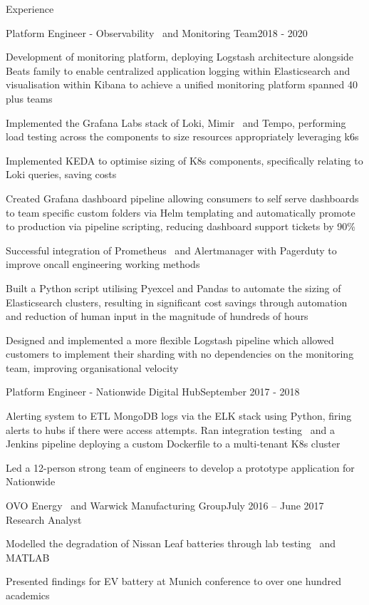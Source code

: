 \documentclass{resume} %
\begin{document}
\begin{rSection}{Experience}
\begin{rSubsection}{}{}{Platform Engineer - Observability \ and  Monitoring Team}{2018 - 2020}
\normalfont
\item Development of monitoring platform, deploying Logstash architecture alongside Beats family to enable centralized application logging within Elasticsearch and visualisation within Kibana to achieve a unified monitoring platform spanned 40 plus  teams
\item Implemented the Grafana Labs stack of Loki, Mimir \ and  Tempo, performing load testing across the components to size resources appropriately leveraging k6s
\item Implemented KEDA to optimise sizing of K8s components, specifically relating to Loki queries, saving costs
\item Created Grafana dashboard pipeline allowing consumers to self serve dashboards to team specific custom folders via Helm templating and automatically promote to production via pipeline scripting, reducing dashboard support tickets by 90\%
\item Successful integration of Prometheus \ and  Alertmanager with Pagerduty to improve oncall engineering working methods
\item Built a Python script utilising Pyexcel and Pandas to automate the sizing of Elasticsearch clusters, resulting in significant cost savings through automation and reduction of human input in the magnitude of hundreds of hours
\item Designed and implemented a more flexible Logstash pipeline which allowed customers to implement their sharding with no dependencies on the monitoring team, improving organisational velocity
\end{rSubsection}

\begin{rSubsection}{}{}{Platform Engineer - Nationwide Digital Hub}{September 2017 - 2018}
\normalfont
\item Alerting system to ETL MongoDB logs via the ELK stack using Python, firing alerts to hubs if there were access attempts. Ran integration testing \ and  a Jenkins pipeline deploying a custom Dockerfile to a multi-tenant K8s cluster
\item Led a 12-person strong team of engineers to develop a prototype application for Nationwide
\end{rSubsection}

\begin{rSubsection}{OVO Energy \ and  Warwick Manufacturing Group}{July 2016 – June 2017}
{Research Analyst}{}
\normalfont
\item Modelled the degradation of Nissan Leaf batteries through lab testing \ and  MATLAB
\item Presented findings for EV battery at Munich conference to over one hundred academics
\end{rSubsection}

\end{rSection}

\end{document}
